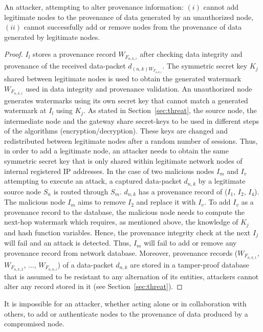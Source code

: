 \documentclass{llncs}
\begin{document}
\begin{theorem}
An attacker, attempting to alter provenance information: $(i)$ cannot add legitimate nodes to the provenance of data generated by an unauthorized node, $(ii)$ cannot successfully add or remove nodes from the provenance of data generated by legitimate nodes.
\end{theorem}

\begin{proof}
$I_l$ stores a provenance record $W_{F_{n,k,i}}$ after checking data integrity and provenance of the received data-packet $d_{(n,k)W_{F_{n,k,i}}}$. The symmetric secret key $K_j$ shared between legitimate nodes is used to obtain the generated watermark $W_{F_{n,k,i}}$ used in data integrity and provenance validation. An unauthorized node generates watermarks using its own secret key that cannot match a generated watermark at $I_l$ using $K_j$. As stated in Section~\ref{sec:threat}, the source node, the intermediate node and the gateway share secret-keys to be used in different steps of the algorithms (encryption/decryption). These keys are changed and redistributed between legitimate nodes after a random number of sessions. Thus, in order to add a legitimate node, an attacker needs to obtain the same symmetric secret key that is only shared within legitimate network nodes of internal registered IP addresses. In the case of two malicious nodes $I_m$ and $I_v$ attempting to execute an attack, a captured data-packet $d_{n,k}$ by a legitimate source node $S_n$ is routed through $S_m$. $d_{n,k}$ has a provenance record of ($I_1$, $I_2$, $I_4$). The malicious node $I_m$ aims to remove $I_2$ and replace it with $I_v$. To add $I_v$ as a provenance record to the database, the malicious node needs to compute the next-hop watermark which requires, as mentioned above, the knowledge of $K_j$ and hash function variables. Hence, the provenance integrity check at the next $I_j$ will fail and an attack is detected. Thus, $I_m$ will fail to add or remove any provenance record from network database. Moreover, provenance records ($W_{F_{n,k,1}}$, $W_{F_{n,k,2}}$, ..., $W_{F_{n,k,i}}$) of a data-packet $d_{n,k}$ are stored in a tamper-proof database that is assumed to be resistant to any alternation of its entities, attackers cannot alter any record stored in it (see Section~\ref{sec:threat}).
\end{proof}

\begin{theorem}
It is impossible for an attacker, whether acting alone or in collaboration with others, to add or authenticate nodes to the provenance of data produced by a compromised node.
\end{theorem}
\end{document}
